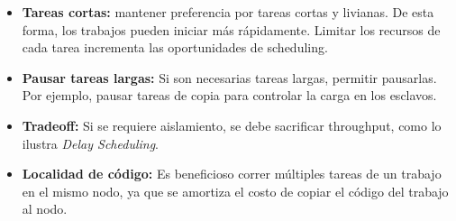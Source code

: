 \begin{itemize}

\item \textbf{Tareas cortas:} mantener preferencia por tareas cortas y livianas. De esta forma, los trabajos pueden iniciar m\'as r\'apidamente. Limitar los recursos de cada tarea incrementa las oportunidades de scheduling.

\item \textbf{Pausar tareas largas:} Si son necesarias tareas largas, permitir pausarlas. Por ejemplo, pausar tareas de copia para controlar la carga en los esclavos.

\item \textbf{Tradeoff:} Si se requiere aislamiento, se debe sacrificar throughput, como lo ilustra \emph{Delay Scheduling}.

\item \textbf{Localidad de c\'odigo:} Es beneficioso correr m\'ultiples tareas de un trabajo en el mismo nodo, ya que se amortiza el costo de copiar el c\'odigo del trabajo al nodo.

\end{itemize}
